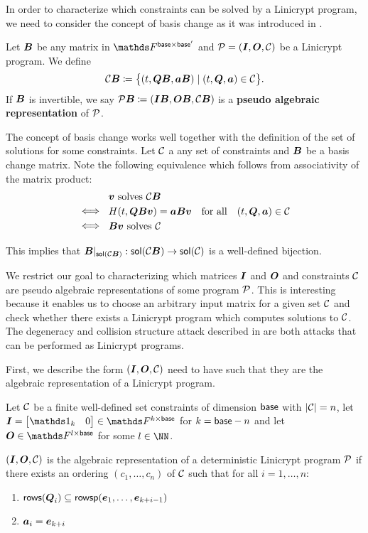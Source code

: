 In order to characterize which constraints can be solved by a Linicrypt program,
we need to consider the concept of basis change as it was introduced in \cite{C:CarRos16}.

\begin{defn}
    Let $\v B$ be any matrix in $\F^{\base \times \base'}$
    and $\P = (\Inp, \O, \C)$ be a Linicrypt program.
    We define 
    \[
        \C \B \coloneqq \big\{ (t, \Q \B, \va \B) \mid (t, \Q, \va) \in \C \big\}.
    \]
    If $\B$ is invertible,
    we say $\P\B \coloneqq (\Inp \B, \O \B, \C \B)$ is a \textbf{pseudo algebraic representation} of $\P$.
\end{defn}

The concept of basis change works well together with the definition of the set of solutions for some constraints.
Let $\C$ a any set of constraints and $\B$ be a basis change matrix.
Note the following equivalence which follows from associativity of the matrix product:
\begin{align*}
&\parbox{30pt}{\phantom{$\iff$}} \vv \textrm{ solves } \C\B \\
&\parbox{30pt}{$\iff$} \H(t, \Q \B \vv) = \va \B \vv \quad \textrm{for all} \quad (t, \Q, \va) \in \C \\
&\parbox{30pt}{$\iff$} \B \vv \textrm{ solves } \C
\end{align*}

This implies that $\B|_{\sol(\C\B)}: \sol(\C\B) \to \sol(\C)$ is a well-defined bijection.

We restrict our goal to characterizing which matrices $\I$ and $\O$ and constraints $\C$ are pseudo algebraic representations of some program $\P$. 
This is interesting because it enables us to choose an arbitrary input matrix for a given set $\C$ and check whether there exists a Linicrypt program which computes solutions to $\C$.
The degeneracy and collision structure attack described in \cite{TCC:McQSwoRos19} are both attacks that can be performed as Linicrypt programs.

First, we describe the form $(\I, \O, \C)$ need to have such that they are the algebraic representation of a Linicrypt program.
\begin{lemma}
\label{is_algebraic_repr}
    Let $\C$ be a finite well-defined set constraints of dimension $\base$ with $|\C| = n$,
    let $\I = \m{\Id_k & 0} \in \F^{k\times\base}$ for $k = \base - n$
    and let $\O \in \F^{l \times \base}$ for some $l \in \NN$.
       
    $(\I, \O, \C)$ is the algebraic representation of a deterministic Linicrypt program $\P$
    if there exists an ordering $(c_1, \dots, c_n)$ of $\C$
    such that for all $i=1, \dots, n$:
    \begin{enumerate}
    \item
    $\rows(\Q_i) \subseteq \rowsp(\dts \ve {k+i-1})$
    \item
    $\va_i = \ve_{k+i}$
    \end{enumerate}
\end{lemma}

